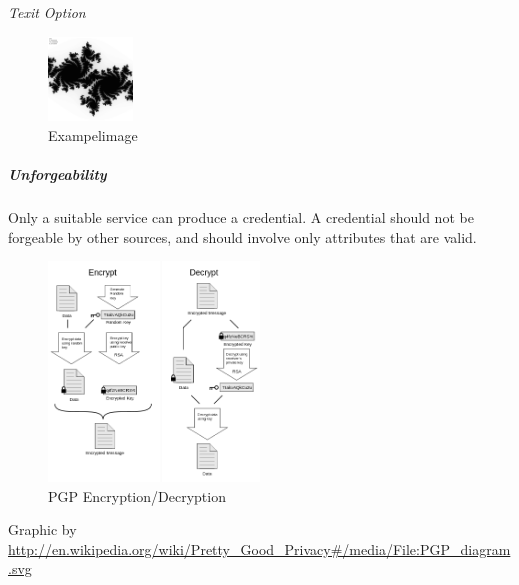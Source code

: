 \textit{Texit Option}

\begin{figure}[h!]
  \centering
      \includegraphics[width=0.2\textwidth]{images/Julia-Fractal.png}
  \caption{Exampelimage}
\end{figure}

\subparagraph{Unforgeability}
\label{subp:subparagraph_name}
Only a suitable service can produce a credential. A credential should not be forgeable by other sources, and should involve only attributes that are valid.

\begin{figure}[h!]
  \centering
      \includegraphics[width=0.5\textwidth]{images/pgp.png}
  \caption{PGP Encryption/Decryption}
\end{figure}

Graphic by \url{http://en.wikipedia.org/wiki/Pretty_Good_Privacy#/media/File:PGP_diagram.svg}
